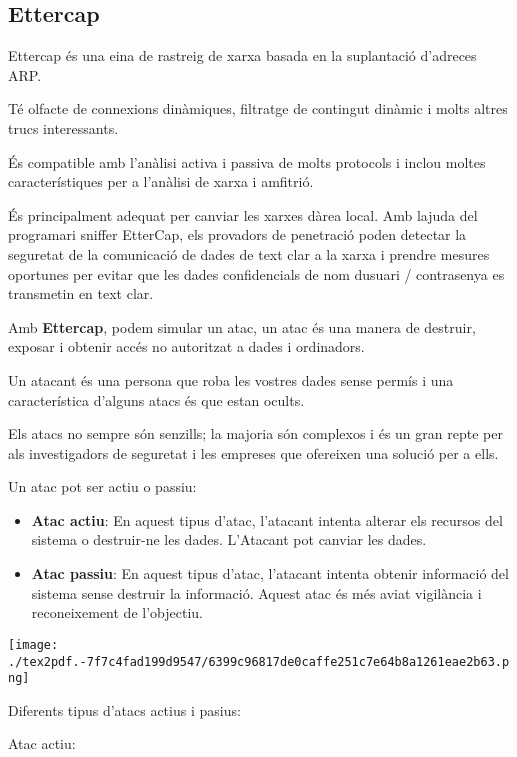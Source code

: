 \documentclass[]{article}
\begin{document}
\hypertarget{ettercap}{%
\subsection{\texorpdfstring{\textbf{Ettercap}}{Ettercap}}\label{ettercap}}

Ettercap és una eina de rastreig de xarxa basada en la suplantació
d'adreces ARP.

Té olfacte de connexions dinàmiques, filtratge de contingut dinàmic i
molts altres trucs interessants.

És compatible amb l'anàlisi activa i passiva de molts protocols i inclou
moltes característiques per a l'anàlisi de xarxa i amfitrió.

És principalment adequat per canviar les xarxes dàrea local. Amb lajuda
del programari sniffer EtterCap, els provadors de penetració poden
detectar la seguretat de la comunicació de dades de text clar a la xarxa
i prendre mesures oportunes per evitar que les dades confidencials de
nom dusuari / contrasenya es transmetin en text clar.

Amb \textbf{Ettercap}, podem simular un atac, un atac és una manera de
destruir, exposar i obtenir accés no autoritzat a dades i ordinadors.

Un atacant és una persona que roba les vostres dades sense permís i una
característica d'alguns atacs és que estan ocults.

Els atacs no sempre són senzills; la majoria són complexos i és un gran
repte per als investigadors de seguretat i les empreses que ofereixen
una solució per a ells.

Un atac pot ser actiu o passiu:

\begin{itemize}
\item
  \textbf{Atac actiu}: En aquest tipus d'atac, l'atacant intenta alterar
  els recursos del sistema o destruir-ne les dades. L'Atacant pot
  canviar les dades.
\item
  \textbf{Atac passiu}: En aquest tipus d'atac, l'atacant intenta
  obtenir informació del sistema sense destruir la informació. Aquest
  atac és més aviat vigilància i reconeixement de l'objectiu.
\end{itemize}

\texttt{[image: ./tex2pdf.-7f7c4fad199d9547/6399c96817de0caffe251c7e64b8a1261eae2b63.png]}

Diferents tipus d'atacs actius i pasius:

Atac actiu:
\end{document}
